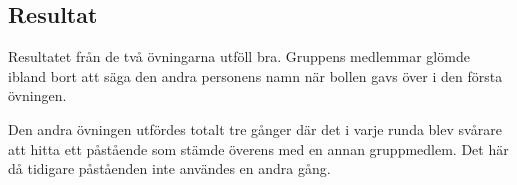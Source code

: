 \subsection{Resultat}
Resultatet från de två övningarna utföll bra. Gruppens medlemmar glömde ibland bort att säga den andra personens namn när bollen gavs över i den första övningen.

\bigskip

Den andra övningen utfördes totalt tre gånger där det i varje runda blev svårare att hitta ett påstående som stämde överens med en annan gruppmedlem. Det här då tidigare påståenden inte användes en andra gång.